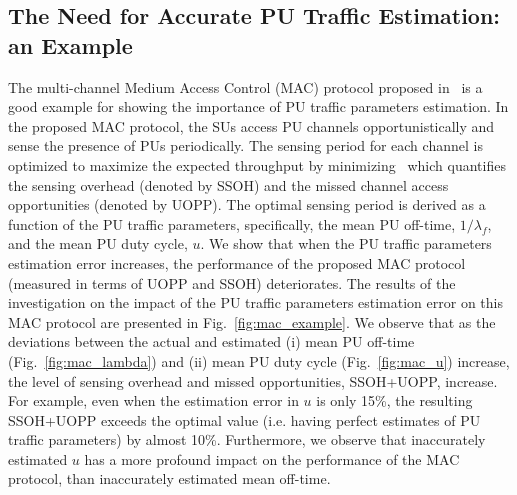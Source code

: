 \documentclass[11pt,draftclsnofoot,journal,onecolumn]{IEEEtran}
\begin{document}
\subsection{The Need for Accurate PU Traffic Estimation: an Example}
\label{sec:motovation}

The multi-channel Medium Access Control (MAC) protocol proposed in~\cite{kim_tmc_2008} is a good example for showing the importance of PU traffic parameters estimation. In the proposed MAC protocol, the SUs access PU channels opportunistically and sense the presence of PUs periodically. The sensing period for each channel is optimized to maximize the expected throughput by minimizing~\cite[Eq. (1)]{kim_tmc_2008} which quantifies the sensing overhead (denoted by SSOH) and the missed channel access opportunities (denoted by UOPP). The optimal sensing period is derived as a function of the PU traffic parameters, specifically, the mean PU off-time, $1/\lambda_f$, and the mean PU duty cycle, $u$. We show that when the PU traffic parameters estimation error increases, the performance of the proposed MAC protocol (measured in terms of UOPP and SSOH) deteriorates. The results of the investigation on the impact of the PU traffic parameters estimation error on this MAC protocol are presented in Fig.~\ref{fig:mac_example}. We observe that as the deviations between the actual and estimated (i) mean PU off-time (Fig.~\ref{fig:mac_lambda}) and (ii) mean PU duty cycle (Fig.~\ref{fig:mac_u}) increase, the level of sensing overhead and missed opportunities, SSOH+UOPP, increase. For example, even when the estimation error in $u$ is only 15\%, the resulting SSOH+UOPP exceeds the optimal value (i.e. having perfect estimates of PU traffic parameters) by almost 10\%. Furthermore, we observe that inaccurately estimated $u$ has a more profound impact on the performance of the MAC protocol, than inaccurately estimated mean off-time.
\end{document}
